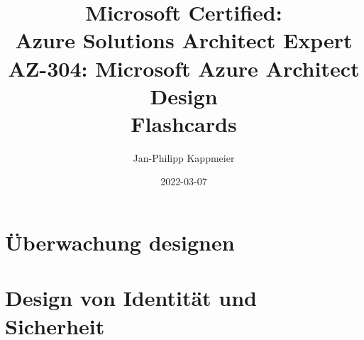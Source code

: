 \documentclass{scrartcl}
\newcommand{\sectioncard}[1]{
    \vspace*{\stretch{1}}
    \section{#1}
    \vspace*{\stretch{1}}
    \pagebreak
}
\begin{document}
    \title{Microsoft Certified:\\Azure Solutions Architect Expert\\\vspace{2mm}AZ-304: Microsoft Azure Architect Design\\Flashcards}
    \date{2022-03-07}
    \author{Jan-Philipp Kappmeier}

    \clearpage\maketitle
    \thispagestyle{empty}
    \pagebreak

    \sectioncard{Überwachung designen}

    
 
    
 
    \sectioncard{Design von Identität und Sicherheit}

    

    

    

    

    

    

    

    

    

    

    

    

    \doclicenseThis
    \pagebreak
\end{document}
